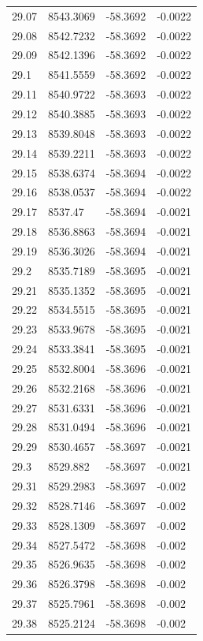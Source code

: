 \begin{table}[H]
\begin{tabular}{llll}
29.07 & 8543.3069 & -58.3692 & -0.0022 \\
29.08 & 8542.7232 & -58.3692 & -0.0022 \\
29.09 & 8542.1396 & -58.3692 & -0.0022 \\
29.1 & 8541.5559 & -58.3692 & -0.0022 \\
29.11 & 8540.9722 & -58.3693 & -0.0022 \\
29.12 & 8540.3885 & -58.3693 & -0.0022 \\
29.13 & 8539.8048 & -58.3693 & -0.0022 \\
29.14 & 8539.2211 & -58.3693 & -0.0022 \\
29.15 & 8538.6374 & -58.3694 & -0.0022 \\
29.16 & 8538.0537 & -58.3694 & -0.0022 \\
29.17 & 8537.47 & -58.3694 & -0.0021 \\
29.18 & 8536.8863 & -58.3694 & -0.0021 \\
29.19 & 8536.3026 & -58.3694 & -0.0021 \\
29.2 & 8535.7189 & -58.3695 & -0.0021 \\
29.21 & 8535.1352 & -58.3695 & -0.0021 \\
29.22 & 8534.5515 & -58.3695 & -0.0021 \\
29.23 & 8533.9678 & -58.3695 & -0.0021 \\
29.24 & 8533.3841 & -58.3695 & -0.0021 \\
29.25 & 8532.8004 & -58.3696 & -0.0021 \\
29.26 & 8532.2168 & -58.3696 & -0.0021 \\
29.27 & 8531.6331 & -58.3696 & -0.0021 \\
29.28 & 8531.0494 & -58.3696 & -0.0021 \\
29.29 & 8530.4657 & -58.3697 & -0.0021 \\
29.3 & 8529.882 & -58.3697 & -0.0021 \\
29.31 & 8529.2983 & -58.3697 & -0.002 \\
29.32 & 8528.7146 & -58.3697 & -0.002 \\
29.33 & 8528.1309 & -58.3697 & -0.002 \\
29.34 & 8527.5472 & -58.3698 & -0.002 \\
29.35 & 8526.9635 & -58.3698 & -0.002 \\
29.36 & 8526.3798 & -58.3698 & -0.002 \\
29.37 & 8525.7961 & -58.3698 & -0.002 \\
29.38 & 8525.2124 & -58.3698 & -0.002 \\

\end{tabular}
\end{table}
